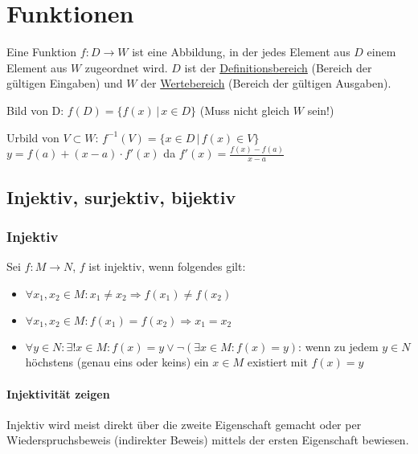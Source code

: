 \section{Funktionen}
Eine Funktion $f: D \rightarrow W$ ist eine Abbildung, in der jedes Element aus
$D$ einem Element aus $W$ zugeordnet wird. $D$ ist der \underline{Definitionsbereich}
(Bereich der gültigen Eingaben) und $W$ der \underline{Wertebereich}
(Bereich der gültigen Ausgaben).

Bild von D: $f(D) = \{ f(x) \, | \, x \in D \}$ (Muss nicht gleich $W$ sein!)

Urbild von $V \subset W$: $f^{-1}(V) = \{ x \in D \, | \, f(x) \in V \}$\\
$ y = f(a) +(x-a)\cdot f'(x)$ da $f'(x) = \frac{f(x)-f(a)}{x-a}$

\subsection{Injektiv, surjektiv, bijektiv}
\subsubsection{Injektiv}
Sei $f: M \rightarrow N$, $f$ ist injektiv, wenn folgendes gilt:
\begin{itemize}
	\item $\forall x_1, x_2 \in M: x_1 \neq x_2 \Rightarrow f(x_1) \neq f(x_2)$
	\item $\forall x_1, x_2 \in M: f(x_1) = f(x_2) \Rightarrow x_1 = x_2$
	\item $\forall y \in N: \exists !x \in M: f(x) = y \lor \lnot(\exists x \in M: f(x) = y)$: wenn zu jedem $y \in N$ höchstens (genau eins oder keins) ein $x \in M$ existiert mit $f(x) = y$
\end{itemize}


\paragraph{Injektivität zeigen}
Injektiv wird meist direkt über die zweite Eigenschaft gemacht oder per Wiederspruchsbeweis (indirekter Beweis) mittels der ersten Eigenschaft bewiesen.


